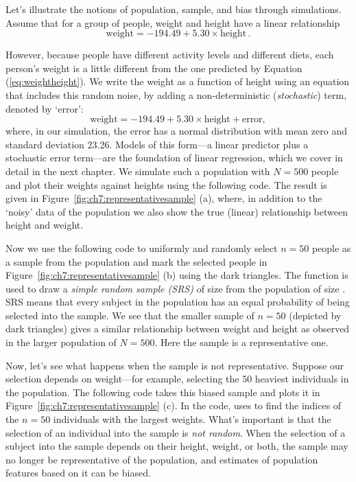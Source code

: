 Let's illustrate the notions of population, sample, and bias through simulations.
Assume that for a group of people,  weight and height have a linear relationship
\begin{equation}
  \label{eq:weightheight}
  \text{weight} = -194.49 + 5.30 \times \text{height}\,.
\end{equation}

However, because people have different activity levels and different diets, each
person's weight is a little different from the one predicted by Equation (\ref{eq:weightheight}).
We write the weight as a function of height using an equation that includes this 
random noise, by adding
a non-deterministic (\emph{stochastic}) term, denoted by `error':
\begin{equation}
  \label{eq:weightheight-stochastic}
  \text{weight} = -194.49 + 5.30 \times \text{height} + \text{error},
\end{equation}
where, in our simulation, the error has a normal distribution with mean zero and standard deviation
23.26. Models of this form---a linear predictor plus a stochastic error term---are the foundation of
linear regression, which we cover in detail in the next chapter. We simulate such a population with $N=500$ people and plot their weights
against heights using the following code. The result is given in
Figure~\ref{fig:ch7:representativesample} (a), where, in addition to the 
`noisy' data of the population we also show the true (linear)
relationship between height and weight.


Now we use the following code to uniformly and randomly select $n=50$ people as
a sample from the population and mark the selected people in
Figure~\ref{fig:ch7:representativesample} (b) using the dark triangles. The  function
is used to draw a \emph{simple random sample (SRS)} of size 
from the population of size . SRS means that every subject in
the population has an equal probability of being selected into the sample.
We see that the smaller sample of
$n=50$ (depicted by dark triangles) gives a similar relationship between weight 
and height as observed in the
larger population of $N=500$. Here the sample is a representative one. 


Now, let's see what happens when the sample is not representative. Suppose our
selection depends on weight---for example, selecting the 50 heaviest individuals
in the population. The following code takes this biased sample and plots it in
Figure~\ref{fig:ch7:representativesample} (c).
In the code,  uses  to find the indices of the
$n=50$ individuals with the largest weights.
What's important is that the selection of an individual into the sample is
\emph{not random}. When the selection of a subject into the sample
depends on their height, weight, or both, the sample may no longer be representative of the
population, and estimates of population features based on it can be biased.

